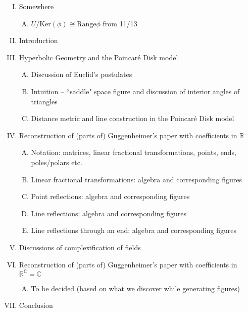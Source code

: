 \documentclass[12pt]{article}
\newcommand{\R}{\mathbb{R}}
\newcommand{\C}{\mathbb{C}}
\newcommand{\poincare}{Poincar\'{e} }
\newcommand{\Range}{\text{Range}}
\newcommand{\Ker}{\text{Ker}}
\begin{document}
\[\]
\newpage\begin{enumerate}[I.]
	\item Somewhere
	\begin{enumerate}[A.]
		\item $U/\Ker(\phi) \cong \Range \phi$ from 11/13
	\end{enumerate}
	\item Introduction
	\item Hyperbolic Geometry and the \poincare Disk model
	\begin{enumerate}[A.]
		\item Discussion of Euclid's postulates 
		\item Intuition -- ``saddle" space figure and discussion of interior angles of triangles
		\item Distance metric and line construction in the \poincare Disk model
	\end{enumerate}
	\item Reconstruction of (parts of) Guggenheimer's paper with coefficients in $\R$
	\begin{enumerate}[A.]
		\item Notation: matrices, linear fractional transformations, points, ends, poles/polars etc.
		\item Linear fractional transformations: algebra and corresponding figures
		\item Point reflections: algebra and corresponding figures
		\item Line reflections: algebra and corresponding figures
		\item Line reflections through an end: algebra and corresponding figures
	\end{enumerate}	
	\item Discussions of complexification of fields 
		\item Reconstruction of (parts of) Guggenheimer's paper with coefficients in $\R^{\C} = \C$
	\begin{enumerate}[A.]
		\item To be decided (based on what we discover while generating figures)
	\end{enumerate}	
	\item Conclusion

\end{enumerate}
\end{document}
